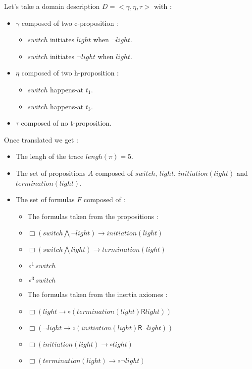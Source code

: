Let's take a domain description $D=<\gamma,\eta,\tau>$ with :
\begin{itemize}
  \item $\gamma$ composed of two c-proposition :
  \begin{itemize}
    \item $switch$ initiates $light$ when $\neg light$.
    \item $switch$ initiates $\neg light$ when $light$.
  \end{itemize}
  \item $\eta$ composed of two h-proposition :
  \begin{itemize}
    \item $switch$ happens-at $t_1$.
    \item $switch$ happens-at $t_3$.
  \end{itemize}
  \item $\tau$ composed of no t-proposition.
\end{itemize}

Once translated we get :
\begin{itemize}
  \item The lengh of the trace $lengh(\pi)=5$.
  \item The set of propositions $A$ composed of $switch$, $light$, $initiation(light)$ and $termination(light)$.
  \item The set of formulas $F$ composed of :
  \begin{itemize}
    \item The formulas taken from the propositions :
    \item $\Box(switch\bigwedge \neg light)\rightarrow initiation(light)$
    \item $\Box(switch\bigwedge light)\rightarrow termination(light)$
    \item $\circ^{1}switch$
    \item $\circ^{3}switch$
    \item The formulas taken from the inertia axiomes :
    \item $\Box(light\rightarrow\circ (termination(light) \mathbin{\bm{\mathsf{R}}} light))$
    \item $\Box(\neg light\rightarrow\circ (initiation(light) \mathbin{\bm{\mathsf{R}}} \neg light))$
    \item $\Box(initiation(light)\rightarrow\circ light)$
    \item $\Box(termination(light)\rightarrow\circ \neg light)$
  \end{itemize}
\end{itemize}

